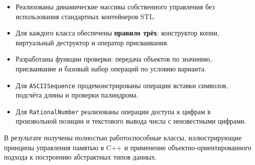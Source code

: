 \documentclass[a4paper, 14pt]{extarticle}
\begin{document}
\begin{itemize}[nosep]
    \item Реализованы динамические массивы собственного управления без использования стандартных контейнеров STL.
    \item Для каждого класса обеспечены \textbf{правило трёх}: конструктор копии, виртуальный деструктор и оператор присваивания.
    \item Разработаны функции проверки: передача объектов по значению, присваивание и базовый набор операций по условию варианта.
    \item Для \texttt{ASCIISequence} продемонстрированы операции вставки символов, подсчёта длины и проверки палиндрома.
    \item Для \texttt{RationalNumber} реализованы операции доступа к цифрам в произвольной позиции и текстового вывода числа с неизвестными цифрами.
\end{itemize}

В результате получены полностью работоспособные классы, иллюстрирующие принципы управления памятью в C++ и применение объектно-ориентированного подхода к построению абстрактных типов данных.
\end{document}
